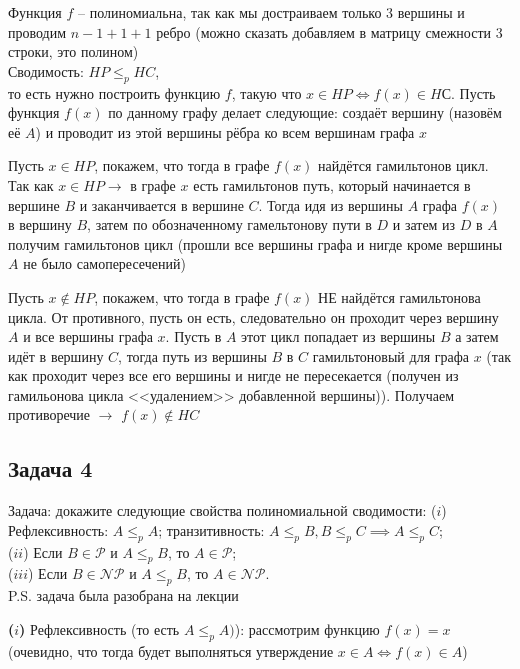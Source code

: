 \documentclass[a4paper,12pt]{article} %
\begin{document}
Функция $ f $ -- полиномиальна, так как мы достраиваем только 3 вершины и проводим $ n-1 + 1 + 1 $ ребро (можно сказать добавляем в матрицу смежности 3 строки, это полином)\\



Сводимость: $ HP \leq_p HC $, \\
то есть нужно построить функцию $ f $, такую что $ x \in HP \Longleftrightarrow f(x)\in HС $.
Пусть функция $ f(x) $ по данному графу делает следующие: создаёт вершину (назовём её $ A $) и проводит из этой вершины рёбра ко всем вершинам графа $ x $

Пусть $ x\in HP $, покажем, что тогда в графе $ f(x) $ найдётся гамильтонов цикл. Так как  $ x\in HP \longrightarrow$
в графе $ x $ есть гамильтонов путь, который начинается в вершине $ B $ и заканчивается в вершине $ C $. Тогда идя из вершины $ A $ графа $ f(x) $ в вершину $ B $, затем по обозначенному гамельтонову пути в $ D $ и затем из $ D $ в $ A $ получим гамильтонов цикл (прошли все вершины графа и нигде кроме вершины $ A $ не было самопересечений)

Пусть  $ x\notin HP $, покажем, что тогда в графе $ f(x) $ НЕ найдётся гамильтонова цикла. От противного, пусть он есть, следовательно он проходит через вершину $ A $ и все вершины графа $ x $. Пусть в $ A $ этот цикл попадает из вершины $ B $ а затем идёт в вершину $ C $, тогда путь из вершины $ B $ в $ C $ гамильтоновый для графа $ x $ (так как проходит через все его вершины и нигде не пересекается (получен из гамильонова цикла <<удалением>> добавленной вершины)). Получаем противоречие $ \longrightarrow $ $ f(x)\notin HC $
\subsection*{Задача 4}
Задача: докажите следующие свойства полиномиальной сводимости:
($i$) Рефлексивность: $A\leq_p A$; транзитивность: $A\leq_p B, B\leq_p C \implies A\leq_p C$;\\
($ii$) Если $B\in\mathcal{P}$ и $A\leq_p B$, то $A\in\mathcal{P}$;\\
($iii$) Если $B\in\mathcal{NP}$ и $A\leq_p B$, то $A\in\mathcal{NP}$.\\

P.S. задача была разобрана на лекции 

{\bf ($i$)} Рефлексивность (то есть $ A \leq_p A) $): рассмотрим функцию $ f(x) = x $ (очевидно, что тогда будет выполняться утверждение $ x \in A \Longleftrightarrow f(x)\in A $)
\end{document}
